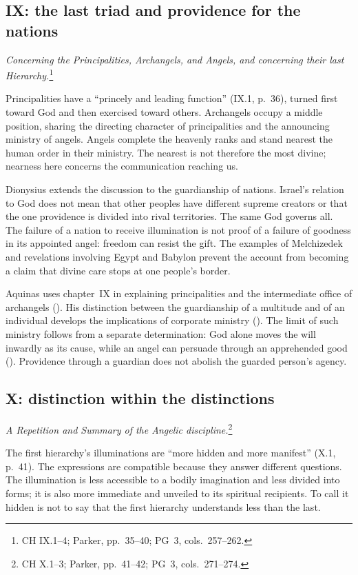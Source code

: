 \subsection{IX: the last triad and providence for the nations}
\emph{Concerning the Principalities, Archangels, and Angels, and concerning their last Hierarchy.}\footnote{CH IX.1--4; Parker, pp.~35--40; PG~3, cols.~257--262.}

Principalities have a ``princely and leading function'' (IX.1, p.~36), turned first toward God and then exercised toward others. Archangels occupy a middle position, sharing the directing character of principalities and the announcing ministry of angels. Angels complete the heavenly ranks and stand nearest the human order in their ministry. The nearest is not therefore the most divine; nearness here concerns the communication reaching us.

Dionysius extends the discussion to the guardianship of nations. Israel's relation to God does not mean that other peoples have different supreme creators or that the one providence is divided into rival territories. The same God governs all. The failure of a nation to receive illumination is not proof of a failure of goodness in its appointed angel: freedom can resist the gift. The examples of Melchizedek and revelations involving Egypt and Babylon prevent the account from becoming a claim that divine care stops at one people's border.

Aquinas uses chapter~IX in explaining principalities and the intermediate office of archangels (). His distinction between the guardianship of a multitude and of an individual develops the implications of corporate ministry (). The limit of such ministry follows from a separate determination: God alone moves the will inwardly as its cause, while an angel can persuade through an apprehended good (). Providence through a guardian does not abolish the guarded person's agency.

\subsection{X: distinction within the distinctions}
\emph{A Repetition and Summary of the Angelic discipline.}\footnote{CH X.1--3; Parker, pp.~41--42; PG~3, cols.~271--274.}

The first hierarchy's illuminations are ``more hidden and more manifest'' (X.1, p.~41). The expressions are compatible because they answer different questions. The illumination is less accessible to a bodily imagination and less divided into forms; it is also more immediate and unveiled to its spiritual recipients. To call it hidden is not to say that the first hierarchy understands less than the last.

